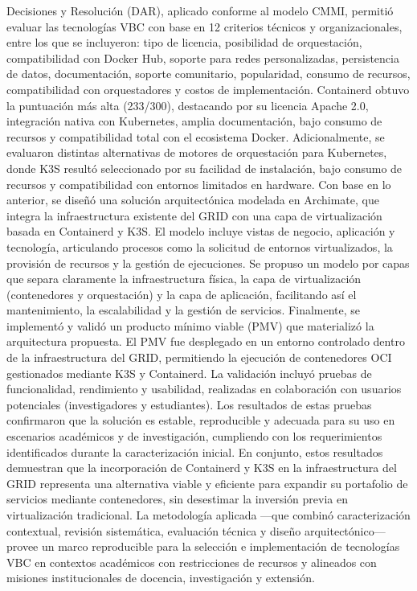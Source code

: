 Decisiones y Resolución (DAR), aplicado conforme al modelo CMMI, permitió evaluar las tecnologías VBC con base en 12 criterios técnicos y organizacionales, entre los que se incluyeron: tipo de licencia, posibilidad de orquestación, compatibilidad con Docker Hub, soporte para redes personalizadas, persistencia de datos, documentación, soporte comunitario, popularidad, consumo de recursos, compatibilidad con orquestadores y costos de implementación. Containerd obtuvo la puntuación más alta (233/300), destacando por su licencia Apache 2.0, integración nativa con Kubernetes, amplia documentación, bajo consumo de recursos y compatibilidad total con el ecosistema Docker. Adicionalmente, se evaluaron distintas alternativas de motores de orquestación para Kubernetes, donde K3S resultó seleccionado por su facilidad de instalación, bajo consumo de recursos y compatibilidad con entornos limitados en hardware. Con base en lo anterior, se diseñó una solución arquitectónica modelada en Archimate, que integra la infraestructura existente del GRID con una capa de virtualización basada en Containerd y K3S. El modelo incluye vistas de negocio, aplicación y tecnología, articulando procesos como la solicitud de entornos virtualizados, la provisión de recursos y la gestión de ejecuciones. Se propuso un modelo por capas que separa claramente la infraestructura física, la capa de virtualización (contenedores y orquestación) y la capa de aplicación, facilitando así el mantenimiento, la escalabilidad y la gestión de servicios. Finalmente, se implementó y validó un producto mínimo viable (PMV) que materializó la arquitectura propuesta. El PMV fue desplegado en un entorno controlado dentro de la infraestructura del GRID, permitiendo la ejecución de contenedores OCI gestionados mediante K3S y Containerd. La validación incluyó pruebas de funcionalidad, rendimiento y usabilidad, realizadas en colaboración con usuarios potenciales (investigadores y estudiantes). Los resultados de estas pruebas confirmaron que la solución es estable, reproducible y adecuada para su uso en escenarios académicos y de investigación, cumpliendo con los requerimientos identificados durante la caracterización inicial. En conjunto, estos resultados demuestran que la incorporación de Containerd y K3S en la infraestructura del GRID representa una alternativa viable y eficiente para expandir su portafolio de servicios mediante contenedores, sin desestimar la inversión previa en virtualización tradicional. La metodología aplicada —que combinó caracterización contextual, revisión sistemática, evaluación técnica y diseño arquitectónico— provee un marco reproducible para la selección e implementación de tecnologías VBC en contextos académicos con restricciones de recursos y alineados con misiones institucionales de docencia, investigación y extensión.